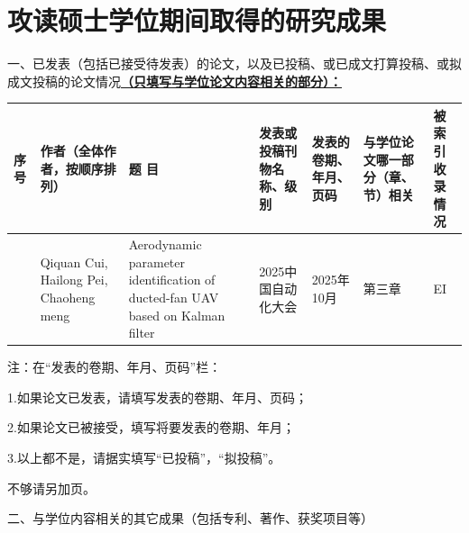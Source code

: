 \chapter{攻读硕士学位期间取得的研究成果} %
\pubfont %
一、已发表（包括已接受待发表）的论文，以及已投稿、或已成文打算投稿、或拟成文投稿的论文情况\underline{\textbf{（只填写与学位论文内容相关的部分）：}}
\begin{table}
	\centering{}%
	\pubfont 
	\begin{longtable}{|>{\centering}m{0.5cm}|m{1.8cm}|>{\centering}m{2.8cm}|>{\centering}m{2.5cm}|>{\centering}m{2.2cm}|>{\centering}m{}|>{\centering}m{1cm}|}
		\hline 
		\textbf{序号} & \textbf{作者（全体作者，按顺序排列）} & \textbf{题 目} 						   & \textbf{发表或投稿刊物名称、级别} & \textbf{发表的卷期、年月、页码} & \textbf{与学位论文哪一部分（章、节）相关} &\textbf{被索引收录情况}\tabularnewline
		\hline
		1  & Qiquan Cui, Hailong Pei, Chaoheng meng & Aerodynamic parameter identification of ducted-fan UAV based on
		Kalman filter & 2025中国自动化大会 & 2025年10月        & 第三章               & EI\tabularnewline
		\hline 
	\end{longtable}
\end{table}

注：在“发表的卷期、年月、页码”栏：

1.如果论文已发表，请填写发表的卷期、年月、页码；

2.如果论文已被接受，填写将要发表的卷期、年月；

3.以上都不是，请据实填写“已投稿”，“拟投稿”。

不够请另加页。

二、与学位内容相关的其它成果（包括专利、著作、获奖项目等）




\normalsize %


